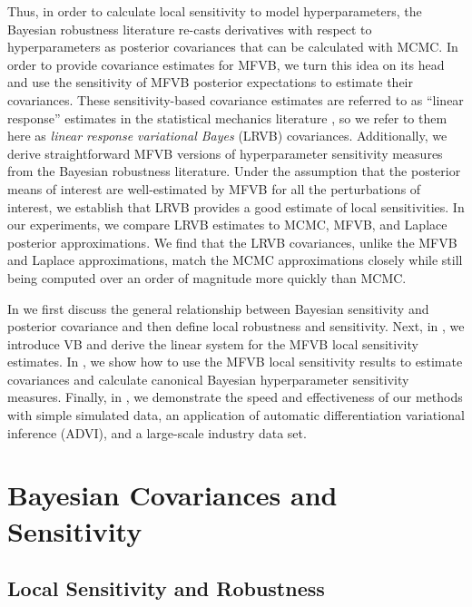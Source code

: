\documentclass{article}\usepackage[]{graphicx}\usepackage[]{color}
\theoremstyle{definition}
\theoremstyle{plain}
\theoremstyle{plain}
\theoremstyle{plain}
\theoremstyle{definition}
\theoremstyle{plain}
\theoremstyle{plain}
\begin{document}
Thus, in order to calculate local sensitivity to model hyperparameters, the
Bayesian robustness literature re-casts derivatives with respect to
hyperparameters as posterior covariances that can be calculated with MCMC. In
order to provide covariance estimates for MFVB, we turn this idea on its head
and use the sensitivity of MFVB posterior expectations to estimate their
covariances. These sensitivity-based covariance estimates are referred to as
``linear response'' estimates in the statistical mechanics literature
\citep{opper:2001:advancedmeanfield}, so we
refer to them here as \emph{linear response variational Bayes} (LRVB)
covariances. Additionally, we derive straightforward MFVB versions of
hyperparameter sensitivity measures from the Bayesian robustness literature.
Under the assumption that the posterior means of interest are well-estimated by
MFVB for all the perturbations of interest, we establish that LRVB provides a
good estimate of local sensitivities. In our experiments, we compare LRVB
estimates to MCMC, MFVB, and Laplace posterior approximations. We find that the
LRVB covariances, unlike the MFVB and Laplace approximations, match the MCMC
approximations closely while still being computed over an order of magnitude
more quickly than MCMC.

In  we first discuss the general relationship
between Bayesian sensitivity and posterior covariance and then define local
robustness and sensitivity. Next, in ,
we introduce VB and derive the linear
system for the MFVB local sensitivity estimates. In
, we show how to use the MFVB local
sensitivity results to estimate covariances and calculate canonical
Bayesian hyperparameter sensitivity measures. Finally, in
, we demonstrate the speed and effectiveness of our
methods with simple simulated data, an application of automatic differentiation
variational inference (ADVI), and a large-scale industry data set.
 
\section{Bayesian Covariances and Sensitivity
\label{sec:theory}}


\subsection{Local Sensitivity and Robustness
\label{subsec:local_sensitivity}}
\end{document}
